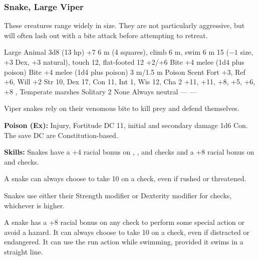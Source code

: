 \subsubsection{Snake, Large Viper}
These creatures range widely in size. They are not particularly aggressive, but will often lash out with a bite attack before attempting to retreat.

\begin{MonsterStats}
{Large Animal}
{3d8 (13 hp)}
{+7}
{6 m (4 squares), climb 6 m, swim 6 m}
{15 ($-1$ size, +3 Dex, +3 natural), touch 12, flat-footed 12}
{+2/+6}
{Bite +4 melee (1d4 plus poison)}
{Bite +4 melee (1d4 plus poison)}
{3 m/1.5 m}
{Poison}
{Scent}
{Fort +3, Ref +6, Will +2}
{Str 10, Dex 17, Con 11, Int 1, Wis 12, Cha 2}
{ +11,  +11,  +8,  +5,  +6,  +8}
{, }
{Temperate marshes}
{Solitary}
{2}
{None}
{Always neutral}
{---}
{---}
\end{MonsterStats}

Viper snakes rely on their venomous bite to kill prey and defend themselves.

\textbf{Poison (Ex):} Injury, Fortitude DC 11, initial and secondary damage 1d6 Con. The save DC are Constitution-based.

\textbf{Skills:} Snakes have a +4 racial bonus on , , and  checks and a +8 racial bonus on  and  checks.

A snake can always choose to take 10 on a  check, even if rushed or threatened.

Snakes use either their Strength modifier or Dexterity modifier for  checks, whichever is higher.

A snake has a +8 racial bonus on any  check to perform some special action or avoid a hazard. It can always choose to take 10 on a  check, even if distracted or endangered. It can use the run action while swimming, provided it swims in a straight line.
